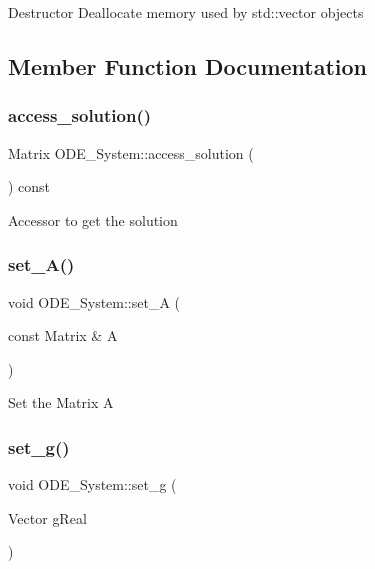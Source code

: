 Destructor Deallocate memory used by std\+::vector objects

\subsection{Member Function Documentation}
\mbox{\label{class_o_d_e___system_aebb5a7971ef1c429077155eec549f713}} 
\subsubsection{\texorpdfstring{access\+\_\+solution()}{access\_solution()}}
{\footnotesize\ttfamily Matrix O\+D\+E\+\_\+\+System\+::access\+\_\+solution (\begin{DoxyParamCaption}{ }\end{DoxyParamCaption}) const}

Accessor to get the solution \mbox{\label{class_o_d_e___system_a24094974423d600f580455427141fa3e}} 
\subsubsection{\texorpdfstring{set\+\_\+\+A()}{set\_A()}}
{\footnotesize\ttfamily void O\+D\+E\+\_\+\+System\+::set\+\_\+A (\begin{DoxyParamCaption}\item[{const Matrix \&}]{A }\end{DoxyParamCaption})}

Set the Matrix A \mbox{\label{class_o_d_e___system_a6906f9069496452cab2b56b6a49635d1}} 
\subsubsection{\texorpdfstring{set\+\_\+g()}{set\_g()}}
{\footnotesize\ttfamily void O\+D\+E\+\_\+\+System\+::set\+\_\+g (\begin{DoxyParamCaption}\item[{Vector }]{gReal }\end{DoxyParamCaption})}

